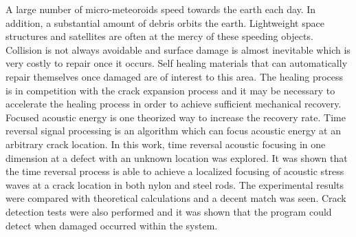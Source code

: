 A large number of micro-meteoroids speed towards the earth each day. In addition, a substantial amount of debris orbits the earth. Lightweight space structures and satellites are often at the mercy of these speeding objects. Collision is not always avoidable and surface damage is almost inevitable which is very costly to repair once it occurs. Self healing materials that can automatically repair themselves once damaged are of interest to this area. The healing process is in competition with the crack expansion process and it may be necessary to accelerate the healing process in order to achieve sufficient mechanical recovery. Focused acoustic energy is one theorized way to increase the recovery rate. Time reversal signal processing is an algorithm which can focus acoustic energy at an arbitrary crack location. In this work, time reversal acoustic focusing in one dimension at a defect with an unknown location was explored. It was shown that the time reversal process is able to achieve a localized focusing of acoustic stress waves at a crack location in both nylon and steel rods. The experimental results were compared with theoretical calculations and a decent match was seen. Crack detection tests were also performed and it was shown that the program could detect when damaged occurred within the system.

